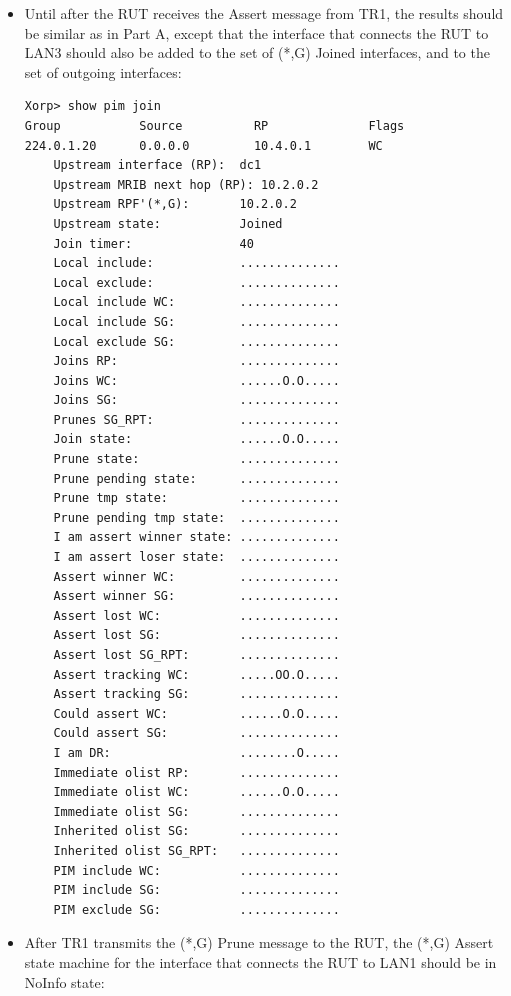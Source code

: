 \documentclass[11pt]{report}
\begin{document}

\begin{itemize}

  \item Until after the RUT receives the Assert message from TR1, the results
  should be similar as in Part A, except that the interface that connects the
  RUT to LAN3 should also be added to the set of (*,G) Joined interfaces, and
  to the set of outgoing interfaces:

\begin{verbatim}
Xorp> show pim join 
Group           Source          RP              Flags
224.0.1.20      0.0.0.0         10.4.0.1        WC   
    Upstream interface (RP):  dc1
    Upstream MRIB next hop (RP): 10.2.0.2
    Upstream RPF'(*,G):       10.2.0.2
    Upstream state:           Joined 
    Join timer:               40
    Local include:            ..............
    Local exclude:            ..............
    Local include WC:         ..............
    Local include SG:         ..............
    Local exclude SG:         ..............
    Joins RP:                 ..............
    Joins WC:                 ......O.O.....
    Joins SG:                 ..............
    Prunes SG_RPT:            ..............
    Join state:               ......O.O.....
    Prune state:              ..............
    Prune pending state:      ..............
    Prune tmp state:          ..............
    Prune pending tmp state:  ..............
    I am assert winner state: ..............
    I am assert loser state:  ..............
    Assert winner WC:         ..............
    Assert winner SG:         ..............
    Assert lost WC:           ..............
    Assert lost SG:           ..............
    Assert lost SG_RPT:       ..............
    Assert tracking WC:       .....OO.O.....
    Assert tracking SG:       ..............
    Could assert WC:          ......O.O.....
    Could assert SG:          ..............
    I am DR:                  ........O.....
    Immediate olist RP:       ..............
    Immediate olist WC:       ......O.O.....
    Immediate olist SG:       ..............
    Inherited olist SG:       ..............
    Inherited olist SG_RPT:   ..............
    PIM include WC:           ..............
    PIM include SG:           ..............
    PIM exclude SG:           ..............
\end{verbatim}

  \item After TR1 transmits the (*,G) Prune message to the RUT, the (*,G)
  Assert state machine for the interface that connects the RUT to LAN1 should
  be in NoInfo state:


\end{itemize}
\end{document}
